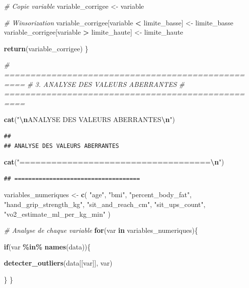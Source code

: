 \documentclass[
]{article}
\newenvironment{Shaded}{\begin{snugshade}}{\end{snugshade}}
\newcommand{\CommentTok}[1]{\textcolor[rgb]{0.56,0.35,0.01}{\textit{#1}}}
\newcommand{\ControlFlowTok}[1]{\textcolor[rgb]{0.13,0.29,0.53}{\textbf{#1}}}
\newcommand{\FunctionTok}[1]{\textcolor[rgb]{0.13,0.29,0.53}{\textbf{#1}}}
\newcommand{\NormalTok}[1]{#1}
\newcommand{\OtherTok}[1]{\textcolor[rgb]{0.56,0.35,0.01}{#1}}
\newcommand{\SpecialCharTok}[1]{\textcolor[rgb]{0.81,0.36,0.00}{\textbf{#1}}}
\newcommand{\StringTok}[1]{\textcolor[rgb]{0.31,0.60,0.02}{#1}}
\begin{document}
\begin{Shaded}
\begin{Highlighting}[]
\CommentTok{\# Copie variable}
\NormalTok{variable\_corrigee }\OtherTok{\textless{}{-}}\NormalTok{ variable}

\CommentTok{\# Winsorization}
\NormalTok{variable\_corrigee[variable }\SpecialCharTok{\textless{}}\NormalTok{ limite\_basse] }\OtherTok{\textless{}{-}}\NormalTok{ limite\_basse}
\NormalTok{variable\_corrigee[variable }\SpecialCharTok{\textgreater{}}\NormalTok{ limite\_haute] }\OtherTok{\textless{}{-}}\NormalTok{ limite\_haute}

\FunctionTok{return}\NormalTok{(variable\_corrigee)}
\NormalTok{\}}

\CommentTok{\# ==================================================}
\CommentTok{\# 3. ANALYSE DES VALEURS ABERRANTES}
\CommentTok{\# ==================================================}

\FunctionTok{cat}\NormalTok{(}\StringTok{"}\SpecialCharTok{\textbackslash{}n}\StringTok{ANALYSE DES VALEURS ABERRANTES}\SpecialCharTok{\textbackslash{}n}\StringTok{"}\NormalTok{)}
\end{Highlighting}
\end{Shaded}

\begin{verbatim}
## 
## ANALYSE DES VALEURS ABERRANTES
\end{verbatim}

\begin{Shaded}
\begin{Highlighting}[]
\FunctionTok{cat}\NormalTok{(}\StringTok{"====================================}\SpecialCharTok{\textbackslash{}n}\StringTok{"}\NormalTok{)}
\end{Highlighting}
\end{Shaded}

\begin{verbatim}
## ====================================
\end{verbatim}

\begin{Shaded}
\begin{Highlighting}[]
\NormalTok{variables\_numeriques }\OtherTok{\textless{}{-}} \FunctionTok{c}\NormalTok{(}
\StringTok{"age"}\NormalTok{,}
\StringTok{"bmi"}\NormalTok{,}
\StringTok{"percent\_body\_fat"}\NormalTok{,}
\StringTok{"hand\_grip\_strength\_kg"}\NormalTok{,}
\StringTok{"sit\_and\_reach\_cm"}\NormalTok{,}
\StringTok{"sit\_ups\_count"}\NormalTok{,}
\StringTok{"vo2\_estimate\_ml\_per\_kg\_min"}
\NormalTok{)}

\CommentTok{\# Analyse de chaque variable}
\ControlFlowTok{for}\NormalTok{(var }\ControlFlowTok{in}\NormalTok{ variables\_numeriques)\{}

\ControlFlowTok{if}\NormalTok{(var }\SpecialCharTok{\%in\%} \FunctionTok{names}\NormalTok{(data))\{}

\FunctionTok{detecter\_outliers}\NormalTok{(data[[var]], var)}

\NormalTok{\}}
\NormalTok{\}}
\end{Highlighting}
\end{Shaded}
\end{document}
